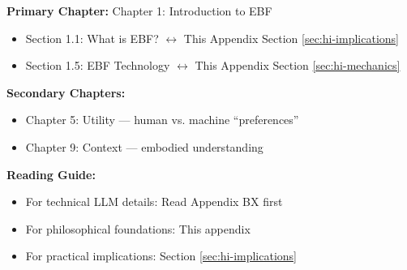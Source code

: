 %
%

%
%
%
%

\begin{tcolorbox}[colback=purple!5!white, colframe=purple!75!black,
    title=Chapter Linkage]

\textbf{Primary Chapter:} Chapter 1: Introduction to EBF
\begin{itemize}[nosep]
\item Section 1.1: What is EBF? $\leftrightarrow$ This Appendix Section \ref{sec:hi-implications}
\item Section 1.5: EBF Technology $\leftrightarrow$ This Appendix Section \ref{sec:hi-mechanics}
\end{itemize}

\textbf{Secondary Chapters:}
\begin{itemize}[nosep]
\item Chapter 5: Utility --- human vs. machine ``preferences''
\item Chapter 9: Context --- embodied understanding
\end{itemize}

\textbf{Reading Guide:}
\begin{itemize}[nosep]
\item For technical LLM details: Read Appendix BX first
\item For philosophical foundations: This appendix
\item For practical implications: Section \ref{sec:hi-implications}
\end{itemize}

\end{tcolorbox}

